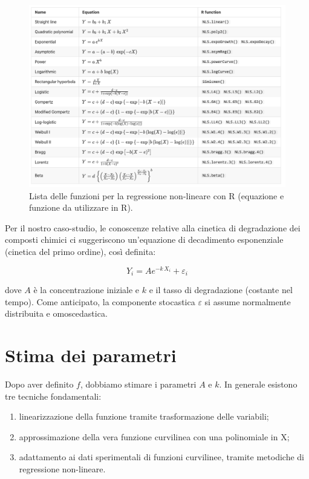 \documentclass[a4paper,12pt,oneside]{book}
\providecommand{\tightlist}{%
  \setlength{\itemsep}{0pt}\setlength{\parskip}{0pt}}
\begin{document}
\begin{figure}

{\centering \includegraphics[width=0.95\linewidth]{_images/nonLinearEquations} 

}

\caption{Lista delle funzioni per la regressione non-lineare con R (equazione e funzione da utilizzare in R).}\label{fig:figName151bis}
\end{figure}

Per il nostro caso-studio, le conoscenze relative alla cinetica di degradazione dei composti chimici ci suggeriscono un'equazione di decadimento esponenziale (cinetica del primo ordine), così definita:

\[Y_i = A e^{-k \,X_i} + \varepsilon_i\]

dove \(A\) è la concentrazione iniziale e \(k\) e il tasso di degradazione (costante nel tempo). Come anticipato, la componente stocastica \(\varepsilon\) si assume normalmente distribuita e omoscedastica.

\hypertarget{stima-dei-parametri-3}{%
\section{Stima dei parametri}\label{stima-dei-parametri-3}}

Dopo aver definito \(f\), dobbiamo stimare i parametri \(A\) e \(k\). In generale esistono tre tecniche fondamentali:

\begin{enumerate}
\def\labelenumi{\arabic{enumi}.}
\tightlist
\item
  linearizzazione della funzione tramite trasformazione delle variabili;
\item
  approssimazione della vera funzione curvilinea con una polinomiale in X;
\item
  adattamento ai dati sperimentali di funzioni curvilinee, tramite metodiche di regressione non-lineare.
\end{enumerate}
\end{document}
